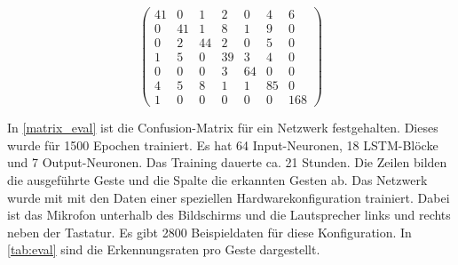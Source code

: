 \begin{center}
\begin{equation}
\label{matrix_eval}
\begin{pmatrix}
41 & 0 & 1 & 2 & 0 & 4 & 6\\
0 & 41 & 1 & 8 & 1 & 9 & 0\\
0 & 2 & 44 & 2 & 0 & 5 & 0 \\
1 & 5 & 0 & 39 & 3 & 4 & 0 \\
0 & 0 & 0 & 3 & 64 & 0 & 0 \\
4 & 5 & 8 & 1 & 1 & 85 & 0 \\
1 & 0 & 0 & 0 & 0 & 0 & 168
\end{pmatrix}
\end{equation}
\end{center}

In \autoref{matrix_eval} ist die Confusion-Matrix für ein Netzwerk festgehalten.
Dieses wurde für 1500 Epochen trainiert. Es hat 64 Input-Neuronen, 18
\ac{LSTM}-Blöcke und 7 Output-Neuronen. Das Training dauerte ca. 21 Stunden. Die
Zeilen bilden die ausgeführte Geste und die Spalte die erkannten Gesten ab. Das
Netzwerk wurde mit mit den Daten einer speziellen Hardwarekonfiguration
trainiert. Dabei ist das Mikrofon unterhalb des Bildschirms und die Lautsprecher
links und rechts neben der Tastatur. Es gibt 2800 Beispieldaten für diese Konfiguration. 
In \autoref{tab:eval} sind die Erkennungsraten pro Geste dargestellt.



